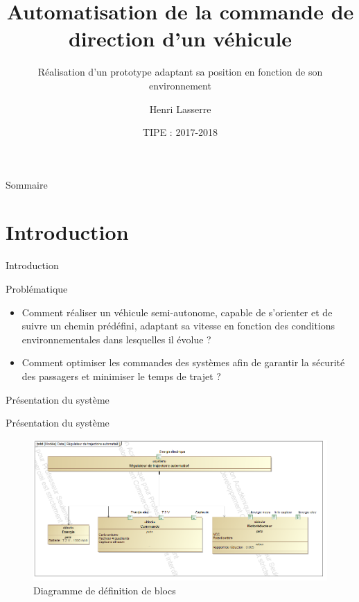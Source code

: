 \documentclass[french, handout]{beamer}
\title[Commande de direction automatisée d'un véhicule]{Automatisation de la commande de direction d'un véhicule}
\subtitle{Réalisation d'un prototype adaptant sa position en fonction de son environnement}
\author{Henri Lasserre}
\date{TIPE : 2017-2018}
\institute{}
\begin{document}
    
    \begin{frame}
        \titlepage
    \end{frame}
    
    \begin{frame}{Sommaire}
        \tableofcontents[hideothersubsections]
    \end{frame}
    
    \section{Introduction}
        \begin{frame}{Introduction}
            \begin{block}{Problématique}
            \begin{itemize}
                \item \quad Comment réaliser un véhicule semi-autonome, capable de s'orienter et de suivre un chemin prédéfini, adaptant sa vitesse en fonction des conditions environnementales dans lesquelles il évolue ?
                \item \quad Comment optimiser les commandes des systèmes afin de garantir la sécurité des passagers et minimiser le temps de trajet ? 
            \end{itemize}
            \end{block}
            
        \end{frame}
        
        \begin{frame}{Présentation du système}
        \begin{figure}
            \centering
            
        \end{figure}
        \end{frame}
        
        \begin{frame}{Présentation du système}
            \begin{figure}
                \hspace*{-2em}
                \includegraphics[scale=0.35]{magicDrawBDD.png}
                \caption{Diagramme de définition de blocs}
            \end{figure}
        \end{frame}
        
\end{document}
